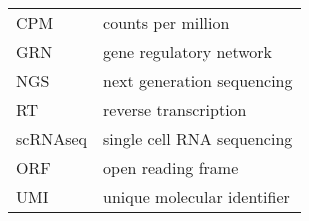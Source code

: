 
\begin{tabular}{@{}ll@{}}
  CPM & counts per million \\
  GRN & gene regulatory network \\
  NGS & next generation sequencing \\
  RT & reverse transcription \\
  scRNAseq & single cell RNA sequencing \\
  ORF & open reading frame \\
  UMI & unique molecular identifier \\
\end{tabular}

